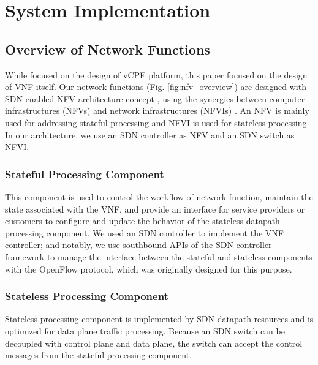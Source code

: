 \chapter{System Implementation} \label{ch:implementation}
\section{Overview of Network Functions} \label{sec:desc_nfv_overview}

While \cite{che-wei-master} focused on the design of vCPE platform, this paper focused on the design of VNF itself.
Our network functions (Fig. \ref{fig:nfv_overview}) are designed with SDN-enabled NFV architecture concept \cite{sdn-enabled}, using the synergies between computer infrastructures (NFVs) and network infrastructures (NFVIs) \cite{etsi-nfv-terminology, etsi-nfv-infra}.
An NFV is mainly used for addressing stateful processing and NFVI is used for stateless processing.
In our architecture, we use an SDN controller as NFV and an SDN switch as NFVI.


\subsection{Stateful Processing Component}
This component is used to control the workflow of network function, maintain the state associated with the VNF, and provide an interface for service providers or customers to configure and update the behavior of the stateless datapath processing component.
We used an SDN controller to implement the VNF controller; and notably, we use southbound APIs of the SDN controller framework to manage the interface between the stateful and stateless components with the OpenFlow protocol, which was originally designed for this purpose.


\subsection{Stateless Processing Component}
Stateless processing component is implemented by SDN datapath resources and is optimized for data plane traffic processing.
Because an SDN switch can be decoupled with control plane and data plane, the switch can accept the control messages from the stateful processing component.


